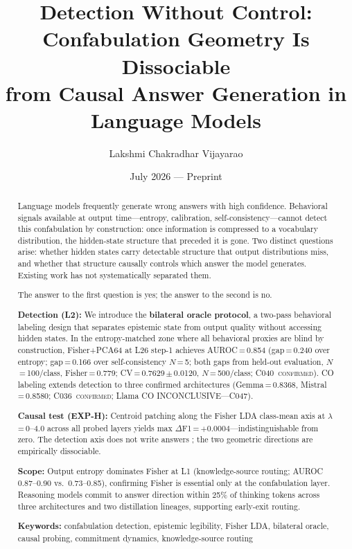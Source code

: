 \documentclass[11pt]{article}
\title{Detection Without Control: Confabulation Geometry Is Dissociable\\
       from Causal Answer Generation in Language Models}
\author[1]{Lakshmi Chakradhar Vijayarao}
\affil[1]{\texttt{lakshmichakradhar.v@gmail.com}}
\date{July 2026 — Preprint}
\begin{document}
\maketitle

\begin{abstract}
Language models frequently generate wrong answers with high confidence. Behavioral
signals available at output time---entropy, calibration, self-consistency---cannot
detect this confabulation by construction: once information is compressed to a
vocabulary distribution, the hidden-state structure that preceded it is gone. Two
distinct questions arise: whether hidden states carry detectable structure that output
distributions miss, and whether that structure causally controls which answer the model
generates. Existing work has not systematically separated them.

The answer to the first question is yes; the answer to the second is no.

\textbf{Detection (L2):} We introduce the \textbf{bilateral oracle protocol}, a
two-pass behavioral labeling design that separates epistemic state from output quality
without accessing hidden states. In the entropy-matched zone where all behavioral
proxies are blind by construction, Fisher+PCA64 at L26 step-1 achieves
AUROC\,=\,0.854 (gap\,=\,0.240 over entropy; gap\,=\,0.166 over self-consistency
$N$\,=\,5; both gaps from held-out evaluation, $N$\,=\,100/class, Fisher\,=\,0.779;
CV\,=\,0.7629\,$\pm$\,0.0120, $N$\,=\,500/class; C040~\textsc{confirmed}). CO
labeling extends detection to three confirmed architectures (Gemma\,=\,0.8368,
Mistral\,=\,0.8580; C036~\textsc{confirmed}; Llama CO INCONCLUSIVE---C047).

\textbf{Causal test (EXP-H):} Centroid patching along the Fisher LDA class-mean
axis at $\lambda$\,=\,0--4.0 across all probed layers yields max
$\Delta$F1\,=\,$+$0.0004---indistinguishable from zero. The detection axis does not
write answers \citep{cox2026decoding}; the two geometric directions are empirically
dissociable.

\textbf{Scope:} Output entropy dominates Fisher at L1 (knowledge-source routing;
AUROC 0.87--0.90 vs.\ 0.73--0.85), confirming Fisher is essential only at the
confabulation layer. Reasoning models commit to answer direction within 25\% of
thinking tokens across three architectures and two distillation lineages, supporting
early-exit routing.

\smallskip\noindent
\textbf{Keywords:} confabulation detection, epistemic legibility, Fisher LDA,
bilateral oracle, causal probing, commitment dynamics, knowledge-source routing
\end{abstract}
\end{document}
